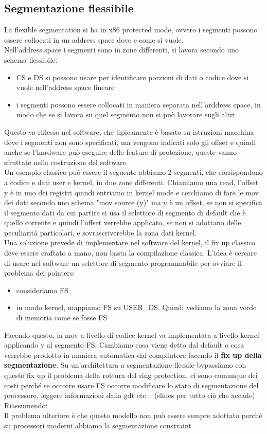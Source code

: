 \documentclass[12pt, oneside]{extbook}
\begin{document}
\subsection{Segmentazione flessibile}
La flexible segmentation si ha in x86 protected mode, ovvero i segmenti possono essere collocati in un address space dove e come si vuole.\\Nell'address space i segmenti sono in zone differenti, si lavora secondo uno schema flessibile:
\begin{itemize}
\item CS e DS si possono usare per identificare porzioni di dati o codice dove si vuole nell'address space lineare
\item i segmenti possono essere collocati in maniera separata nell'arddress space, in modo che se si lavora su quel segmento non si può lavorare sugli altri
\end{itemize} 
Questo va riflesso nel software, che tipicamente è basato su istruzioni macchina dove i segmenti non sono specificati, ma vengono indicati solo gli offset e quindi anche se l'hardware può eseguire delle feature di protezione, queste vanno sfruttate nella costruzione del software.\\Un esempio classico può essere il seguente
abbiamo 2 segmenti, che corrispondono a codice e dati user e kernel, in due zone differenti. Chiamiamo una \textsf{read}, l'offset y è in uno dei registri quindi entriamo in kernel mode e cerchiamo di fare le mov dei dati secondo uno schema "mov source (y)" ma y è un offset, se non si specifica il segmento dati da cui partire si usa il selettore di segmento di default che è quello corrente e quindi l'offset verrebbe applicato, se non si adottano delle peculiarità particolari, e sovrascriverebbe la zona dati kernel.\\Una soluzione prevede di implementare nel software del kernel, il fix up classico deve essere craftato a mano, non basta la compilazione classica. L'idea è cercare di usare nel software un selettore di segmento programmabile per ovviare il problema dei pointers:
\begin{itemize}
\item consideriamo FS
\item in modo kernel, mappiamo FS su USER\_DS. Quindi vediamo la zona verde di memoria come se fosse FS
\end{itemize}
Facendo questo, la mov a livello di codice kernel va implementata a livello kernel applicando y al segmento FS. Cambiamo cosa viene detto dal default o cosa verrebbe prodotto in maniera automatica dal compilatore facendo il \textbf{fix up della segmentazione}. Su un'architettura a segmentazione flessile bypassiamo con questo fix up il problema della rottura del ring protection, ci sono comunque dei costi perché se occorre usare FS occorre modificare lo stato di segmentazione del processore, leggere informazioni dalla gdt etc...
(slides per tutto ciò che accade) Riassumendo:
\\Il problema ulteriore è che questo modello non può essere sempre adottato perché su processori moderni abbiamo la segmentazione constraint
\end{document}
